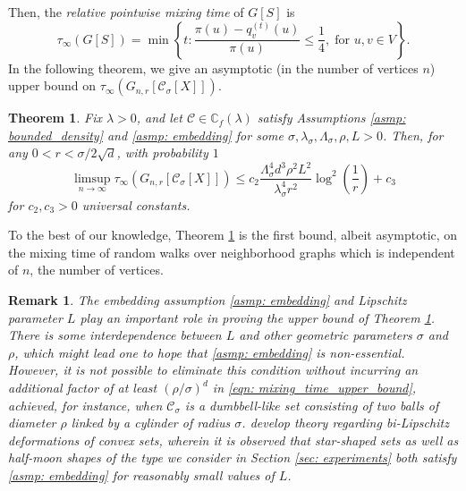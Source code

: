 \documentclass{article}
\newcommand{\set}[1]{\left\{#1\right\}}
\newcommand{\1}{\mathbf{1}}
\newcommand{\Xbf}{X}             %
\newcommand{\Cbb}{\mathbb{C}}
\newcommand{\Cset}{\mathcal{C}}
\newcommand{\Csig}{\Cset_{\sigma}}
\theoremstyle{aldenthm}
\newtheorem{theorem}{Theorem}
\theoremstyle{aldenrmrk}
\newtheorem{remark}{Remark}
\begin{document}
Then, the \emph{relative pointwise mixing time} of $G[S]$ is 
\begin{equation}
\label{eqn: mixing_time}
\tau_{\infty}(G[S]) = \min\set{ t: \frac{\pi(u) - q_{v}^{(t)}(u)
	}{\pi(u)} \leq \frac{1}{4}, 
	\; \text{for $u,v \in V$}}. 
\end{equation}
In the following theorem, we give an asymptotic (in the number of vertices $n$) upper bound on $\tau_{\infty}(G_{n,r}[\Csig[\Xbf]])$.

\begin{theorem}
	\label{thm: mixing_time_upper_bound}
	Fix $\lambda > 0$, and let $\Cset \in \Cbb_f(\lambda)$ satisfy Assumptions \ref{asmp: bounded_density} and \ref{asmp: embedding} for some $\sigma, \lambda_{\sigma}, \Lambda_{\sigma}, \rho, L > 0$. Then, for any $0 < r < \sigma/2\sqrt{d}$, with probability $1$
	\begin{equation}
	\label{eqn: mixing_time_upper_bound}
	\limsup_{n \to \infty}\tau_{\infty}(G_{n,r}[\Csig[\Xbf]]) \leq c_2 \frac{\Lambda_{\sigma}^4 d^3 \rho^2 L^2}{\lambda_{\sigma}^4 r^2} \log^2\left(\frac{1}{r}\right) + c_3
	\end{equation}
	for $c_2,c_3 > 0$ universal constants. 
\end{theorem}

To the best of our knowledge, Theorem \ref{thm: mixing_time_upper_bound} is the first bound, albeit asymptotic, on the mixing time of random walks over neighborhood graphs which is independent of $n$, the number of vertices.
\begin{remark}
	The embedding assumption \ref{asmp: embedding} and Lipschitz parameter $L$ play an important role in proving the upper bound of Theorem \ref{thm: mixing_time_upper_bound}. There is some interdependence between $L$ and other geometric parameters $\sigma$ and $\rho$, which might lead one to hope that \ref{asmp: embedding} is non-essential. However, it is not possible to eliminate this condition without incurring an additional factor of at least $(\rho/\sigma)^d$ in \eqref{eqn: mixing_time_upper_bound}, achieved, for instance, when $\Csig$ is a dumbbell-like set consisting of two balls of diameter $\rho$ linked by a cylinder of radius $\sigma$.  \citep{abbasi-yadkori2016, abbasi-yadkori2016a} develop theory regarding bi-Lipschitz deformations of convex sets, wherein it is observed that star-shaped sets as well as half-moon shapes of the type we consider in Section \ref{sec: experiments} both satisfy \ref{asmp: embedding} for reasonably small values of $L$.
\end{remark}
\end{document}
